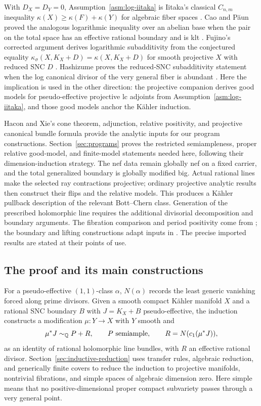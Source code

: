 With \(D_X=D_Y=0\), Assumption~\ref{asm:log-iitaka} is Iitaka's classical
\(C_{n,m}\) inequality
\(\kappa(X)\geq\kappa(F)+\kappa(Y)\) for algebraic fiber spaces
\cite[Equation~(1.0.1)]{CaoPaun2017}. Cao and Păun proved the analogous
logarithmic inequality over an abelian base when the pair on the total space
has an effective rational boundary and is klt
\cite[Theorem~1.1]{CaoPaun2017}. Fujino's corrected argument derives
logarithmic subadditivity from the conjectured equality
\(\kappa_\sigma(X,K_X+D)=\kappa(X,K_X+D)\) for smooth projective
\(X\) with reduced SNC \(D\)
\cite{Fujino2017Subadditivity,Fujino2020Corrigendum}. Hashizume proves the
reduced-SNC subadditivity statement when the log canonical divisor of the
very general fiber is abundant \cite[Theorem~1.2]{Hashizume2020}. Here the
implication is used in the other direction: the projective companion
\cite{LI} derives good models for pseudo-effective projective lc adjoints
from Assumption~\ref{asm:log-iitaka}, and those good models anchor the
Kähler induction.

Hacon and Xie's cone theorem, adjunction, relative positivity, and
projective canonical bundle formula \cite{HX} provide the analytic inputs
for our program constructions. Section~\ref{sec:programs} proves the
restricted semiampleness, proper relative good-model, and finite-model
statements needed here, following their dimension-induction strategy.
The nef data remain globally nef on a fixed carrier, and the total
generalized boundary is globally modified big. Actual rational lines
make the selected ray contractions projective; ordinary projective
analytic results \cite{FujinoAnalyticBCHM} then construct their flips
and the relative models. This produces a Kähler pullback description of
the relevant Bott--Chern class. Generation of the prescribed holomorphic
line requires the additional divisorial decomposition and boundary
arguments. The fibration comparison and period positivity come from
\cite{CI}; the boundary and lifting constructions adapt inputs in
\cite{CB,BL}. The precise imported results are stated at their points
of use.

\subsection{The proof and its main constructions}

For a pseudo-effective \((1,1)\)-class \(\alpha\), \(N(\alpha)\) records
the least generic vanishing forced along prime divisors. Given a smooth
compact Kähler manifold \(X\) and a rational SNC boundary \(B\) with
\(J=K_X+B\) pseudo-effective, the induction constructs a modification
\(\mu:Y\to X\) with \(Y\) smooth and
\[
 \mu^*J\sim_{\mathbb Q}P+R,\qquad P\text{ semiample},\qquad
 R=N(c_1(\mu^*J)),
\]
as an identity of rational holomorphic line bundles, with \(R\) an effective
rational divisor. Section~\ref{sec:inductive-reduction} uses transfer rules,
algebraic reduction, and generically finite covers to reduce the induction
to projective manifolds, nontrivial fibrations, and simple spaces of
algebraic dimension zero. Here simple means that no positive-dimensional
proper compact subvariety passes through a very general point.

